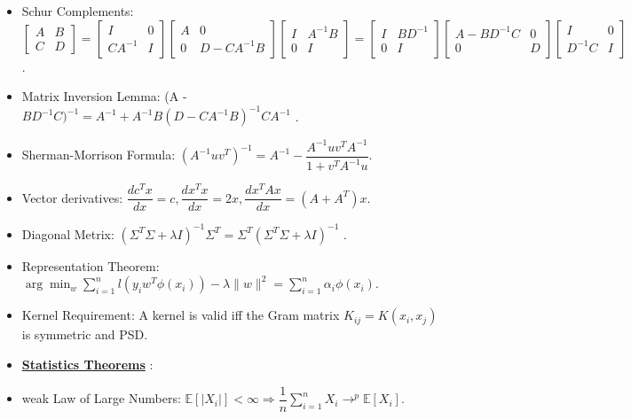 \documentclass{article}
\begin{document}
\begin{itemize}
\item Schur Complements: $\begin{bmatrix} A & B \\ C & D \end{bmatrix} = \begin{bmatrix} I & 0 \\ C A^{-1} & I \end{bmatrix} \begin{bmatrix} A & 0 \\ 0 & D - C A^{-1} B \end{bmatrix} \begin{bmatrix} I & A^{-1} B \\ 0 & I \end{bmatrix} = \begin{bmatrix} I & B D^{-1} \\ 0 & I \end{bmatrix} \begin{bmatrix} A - B D^{-1} C & 0 \\ 0 & D \end{bmatrix} \begin{bmatrix} I & 0 \\ D^{-1} C & I \end{bmatrix}$ .
\item Matrix Inversion Lemma: (A - $B D^{-1} C)^{-1} = A^{-1} + A^{-1} B \left(D - C A^{-1} B\right)^{-1} C A^{-1}$ .
\item Sherman-Morrison Formula: $\left(A^{-1} u v^{T}\right)^{-1} = A^{-1} - \dfrac{A^{-1} u v^{T} A^{-1}}{1 + v^{T} A^{-1} u}$.
\item Vector derivatives: $\dfrac{d c^{T} x}{d x} = c, \dfrac{d x^{T} x}{d x} = 2 x, \dfrac{d x^{T} A x}{d x} = \left(A + A^{T}\right) x. $
\item Diagonal Metrix: $\left(\Sigma^{T} \Sigma + \lambda I\right)^{-1} \Sigma^{T} = \Sigma^{T} \left(\Sigma^{T} \Sigma + \lambda I\right)^{-1}$ .
\item Representation Theorem: $\arg\displaystyle\min_{w} \displaystyle\sum_{i=1}^{n} l\left(y_{i} w^{T} \phi\left(x_{i}\right)\right) - \lambda \| w \|^{2} = \displaystyle\sum_{i=1}^{n} \alpha_{i} \phi\left(x_{i}\right)$.
\item Kernel Requirement: A kernel is valid iff the Gram matrix $K_{ij} = K\left(x_{i}, x_{j}\right)$ is symmetric and PSD.
\item \textbf{\underline{Statistics Theorems}} :
\item weak Law of Large Numbers: $\mathbb{E}\left[| X_{i} |\right] < \infty \Rightarrow  \dfrac{1}{n} \displaystyle\sum_{i=1}^{n} X_{i} \to ^{p} \mathbb{E}\left[X_{i}\right]$.

\end{itemize}
\end{document}
